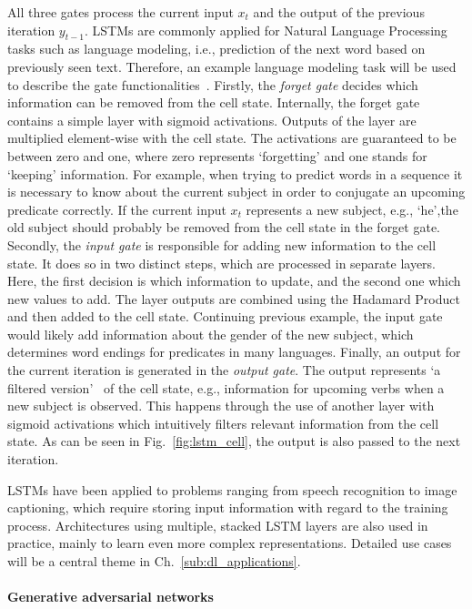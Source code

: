 All three gates process the current input $x_t$ and the output of the previous
iteration $y_{t-1}$.
LSTMs are commonly applied for Natural Language Processing tasks such as
language modeling, i.e., prediction of the next word based on previously seen
text.
Therefore, an example language modeling task will be used to describe the
gate functionalities~\cite{Olah2015}.
Firstly, the \textit{forget gate} decides which information can be removed from
the cell state.
Internally, the forget gate contains a simple layer with sigmoid activations.
Outputs of the layer are multiplied element-wise with the cell state.
The activations are guaranteed to be between zero and one, where zero represents
`forgetting' and one stands for `keeping' information.
For example, when trying to predict words in a sequence it is necessary
to know about the current subject in order to conjugate an upcoming predicate
correctly.
If the current input $x_t$ represents a new subject, e.g., `he',the old subject should
probably be removed from the cell state in the forget gate.
Secondly, the \textit{input gate} is responsible for adding new information to the cell
state.
It does so in two distinct steps, which are processed in separate layers.
Here, the first decision is which information to update, and the second one
which new values to add.
The layer outputs are combined using the Hadamard Product and then added to the
cell state.
Continuing previous example, the input gate would likely add information about
the gender of the new subject, which determines word endings for predicates in
many languages.
Finally, an output for the current iteration is generated in the \textit{output gate}.
The output represents `a filtered version'~\cite{Olah2015} of the cell state, e.g.,
information for upcoming verbs when a new subject is observed.
This happens through the use of another layer with sigmoid activations which
intuitively filters relevant information from the cell state.
As can be seen in Fig.~\ref{fig:lstm_cell}, the output is also passed to the
next iteration.

LSTMs have been applied to problems ranging from speech recognition to
image captioning, which require storing input information with regard to the
training process.
Architectures using multiple, stacked LSTM layers are also used in practice,
mainly to learn even more complex representations.
Detailed use cases will be a central theme in Ch.~\ref{sub:dl_applications}.

\paragraph{Generative adversarial networks}

